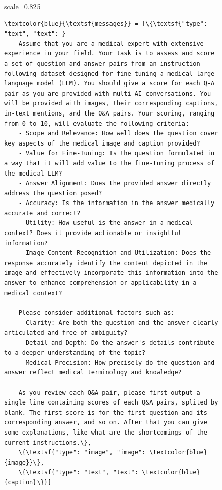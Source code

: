 \begin{figure}[t]
\vspace{-4pt}
\centering
\begin{adjustbox}{scale=0.825}
\begin{minipage}{1.2\columnwidth}
\begin{Verbatim}[frame=single, numbersep=5pt,
                 commandchars=\\\{\}, breaklines=true,  
                 breaksymbolleft={}, breaksymbolright={}]
\textcolor{blue}{\textsf{messages}} = [\{\textsf{"type": "text", "text": }
    Assume that you are a medical expert with extensive experience in your field. Your task is to assess and score a set of question-and-answer pairs from an instruction following dataset designed for fine-tuning a medical large language model (LLM). You should give a score for each Q-A pair as you are provided with multi AI conversations. You will be provided with images, their corresponding captions, in-text mentions, and the Q&A pairs. Your scoring, ranging from 0 to 10, will evaluate the following criteria:
    - Scope and Relevance: How well does the question cover key aspects of the medical image and caption provided?
    - Value for Fine-Tuning: Is the question formulated in a way that it will add value to the fine-tuning process of the medical LLM?
    - Answer Alignment: Does the provided answer directly address the question posed?
    - Accuracy: Is the information in the answer medically accurate and correct?
    - Utility: How useful is the answer in a medical context? Does it provide actionable or insightful information?
    - Image Content Recognition and Utilization: Does the response accurately identify the content depicted in the image and effectively incorporate this information into the answer to enhance comprehension or applicability in a medical context?
    
    Please consider additional factors such as:
    - Clarity: Are both the question and the answer clearly articulated and free of ambiguity?
    - Detail and Depth: Do the answer's details contribute to a deeper understanding of the topic?
    - Medical Precision: How precisely do the question and answer reflect medical terminology and knowledge?
    
    As you review each Q&A pair, please first output a single line containing scores of each Q&A pairs, splited by blank. The first score is for the first question and its corresponding answer, and so on. After that you can give some explanations, like what are the shortcomings of the current instructions.\},
    \{\textsf{"type": "image", "image": \textcolor{blue}{image}}\},
    \{\textsf{"type": "text", "text": \textcolor{blue}{caption}\}}]
    

\end{Verbatim}
\end{minipage}
\end{adjustbox}
\end{figure}
